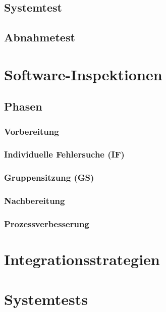 \documentclass[a4paper]{article}
\theoremstyle{break}
\begin{document}
\subsection{Systemtest}
\subsection{Abnahmetest}
\section{Software-Inspektionen}
\subsection{Phasen}
\subsubsection{Vorbereitung}
\subsubsection{Individuelle Fehlersuche (IF)}
\subsubsection{Gruppensitzung (GS)}
\subsubsection{Nachbereitung}
\subsubsection{Prozessverbesserung}
\section{Integrationsstrategien}
\section{Systemtests}
\end{document}
